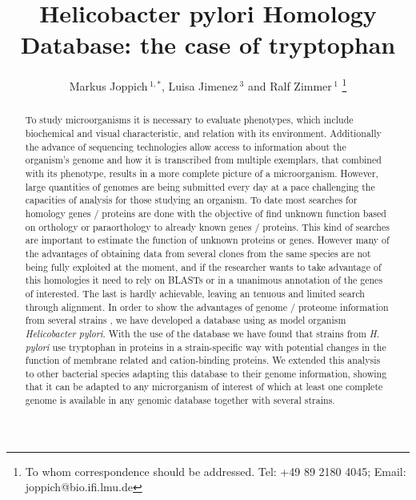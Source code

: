 \documentclass[a4,center,fleqn]{NAR}
\begin{document}
\title{Helicobacter pylori Homology Database: the case of tryptophan}

\author{%
Markus Joppich\,$^{1,*}$,
Luisa Jimenez\,$^{3}$
and Ralf Zimmer\,$^1$%
\footnote{To whom correspondence should be addressed.
Tel: +49 89 2180 4045; Email: joppich@bio.ifi.lmu.de}}

\address{%
$^{1}$Affiliation of Corresponding Author
and
$^{2}$Affiliation of Both Co-Authors}


\maketitle

\begin{abstract}
	To study microorganisms it is necessary to evaluate phenotypes, which include biochemical and visual characteristic, and relation with its environment.
	Additionally the advance of sequencing technologies allow access to information about the organism's genome and how it is transcribed from multiple exemplars, that combined with its phenotype, results in a more complete picture of a microorganism.
	However, large quantities of genomes are being submitted every day at a pace challenging the capacities of analysis for those studying an organism.
	To date most searches for homology genes / proteins are done with the objective of find unknown function based on orthology or paraorthology to already known genes / proteins.
	This kind of searches are important to estimate the function of unknown proteins or genes. However many of the advantages of obtaining data from several clones from the same species are not being fully exploited at the moment, and if the researcher wants to take advantage of this homologies it need to rely on BLASTs or in a unanimous annotation of the genes of interested. The last is hardly achievable, leaving an tenuous and limited search through alignment.
	In order to show the advantages of genome / proteome information from several strains , we have developed a database using as model organism \textit {Helicobacter pylori}.
	With the use of the database we have found that strains from \textit{H. pylori} use tryptophan in proteins in a strain-specific way with potential changes in the function of membrane related and cation-binding proteins.
	We extended this analysis to other bacterial species adapting this database to their genome information, showing that it can be adapted to any microrganism of interest of which at least one complete genome is available in any genomic database together with several strains.
\end{abstract}
\end{document}
